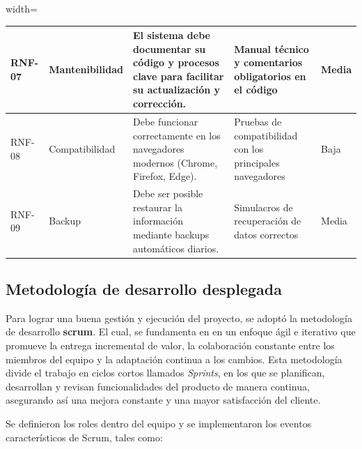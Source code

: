 \documentclass[12pt]{article} %
\begin{document}
  \begin{adjustbox}{width=\linewidth}
    \begin{tabularx}{\linewidth}{|>{\centering\arraybackslash}p{1.3cm}|
      >{\centering\arraybackslash}p{2.3cm}|
      >{\centering\arraybackslash}p{5.1cm}|
      >{\centering\arraybackslash}p{4.1cm}|
      >{\centering\arraybackslash}p{1.5cm}|}
\hline
      RNF-07 & Mantenibilidad & El sistema debe documentar su código y procesos clave para facilitar su actualización y corrección. & Manual técnico y comentarios obligatorios en el código & Media \\
      \hline
      RNF-08 & Compatibilidad & Debe funcionar correctamente en los navegadores modernos (Chrome, Firefox, Edge). & Pruebas de compatibilidad con los principales navegadores & Baja \\
      \hline
      RNF-09 & Backup & Debe ser posible restaurar la información mediante backups automáticos diarios. & Simulacros de recuperación de datos correctos & Media \\
      \hline
    \end{tabularx}
  \end{adjustbox}
  \normalsize

\subsection*{Metodología de desarrollo desplegada}

Para lograr una buena gestión y ejecución del proyecto, se adoptó la metodología de desarrollo \textbf{scrum}. El cual, se fundamenta en en un enfoque ágil e iterativo que promueve la entrega incremental de valor, la colaboración constante entre los miembros del equipo y la adaptación continua a los cambios. Esta metodología divide el trabajo en ciclos cortos llamados \textit{Sprints}, en los que se planifican, desarrollan y revisan funcionalidades del producto de manera continua, asegurando así una mejora constante y una mayor satisfacción del cliente.

Se definieron los roles dentro del equipo y se implementaron los eventos característicos de Scrum, tales como:
\end{document}

